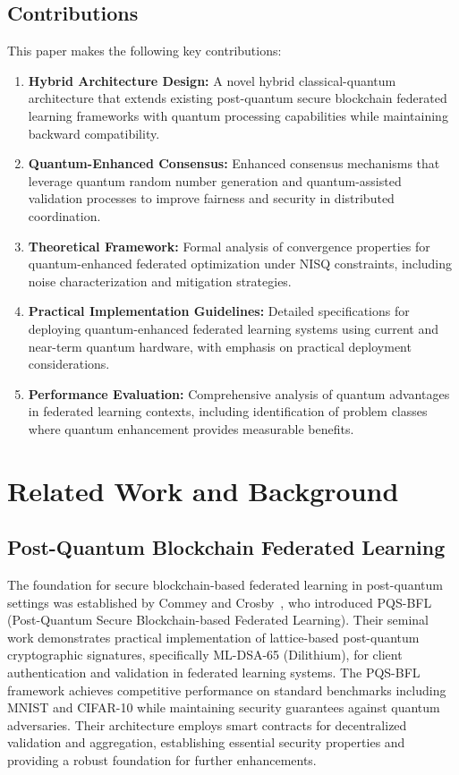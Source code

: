 \documentclass[10pt,journal,compsoc]{IEEEtran}
\begin{document}
\subsection{Contributions}

This paper makes the following key contributions:

\begin{enumerate}
\item \textbf{Hybrid Architecture Design:} A novel hybrid classical-quantum architecture that extends existing post-quantum secure blockchain federated learning frameworks with quantum processing capabilities while maintaining backward compatibility.

\item \textbf{Quantum-Enhanced Consensus:} Enhanced consensus mechanisms that leverage quantum random number generation and quantum-assisted validation processes to improve fairness and security in distributed coordination.

\item \textbf{Theoretical Framework:} Formal analysis of convergence properties for quantum-enhanced federated optimization under NISQ constraints, including noise characterization and mitigation strategies.

\item \textbf{Practical Implementation Guidelines:} Detailed specifications for deploying quantum-enhanced federated learning systems using current and near-term quantum hardware, with emphasis on practical deployment considerations.

\item \textbf{Performance Evaluation:} Comprehensive analysis of quantum advantages in federated learning contexts, including identification of problem classes where quantum enhancement provides measurable benefits.
\end{enumerate}

\section{Related Work and Background}

\subsection{Post-Quantum Blockchain Federated Learning}

The foundation for secure blockchain-based federated learning in post-quantum settings was established by Commey and Crosby~\cite{Commey2025}, who introduced PQS-BFL (Post-Quantum Secure Blockchain-based Federated Learning). Their seminal work demonstrates practical implementation of lattice-based post-quantum cryptographic signatures, specifically ML-DSA-65 (Dilithium), for client authentication and validation in federated learning systems. The PQS-BFL framework achieves competitive performance on standard benchmarks including MNIST and CIFAR-10 while maintaining security guarantees against quantum adversaries. Their architecture employs smart contracts for decentralized validation and aggregation, establishing essential security properties and providing a robust foundation for further enhancements.
\end{document}
